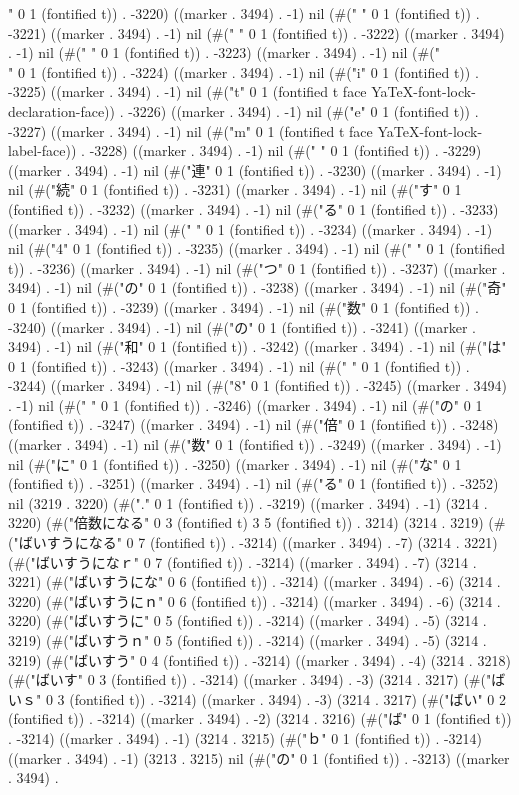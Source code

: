 " 0 1 (fontified t)) . -3220) ((marker . 3494) . -1) nil (#(" " 0 1 (fontified t)) . -3221) ((marker . 3494) . -1) nil (#(" " 0 1 (fontified t)) . -3222) ((marker . 3494) . -1) nil (#(" " 0 1 (fontified t)) . -3223) ((marker . 3494) . -1) nil (#("\\" 0 1 (fontified t)) . -3224) ((marker . 3494) . -1) nil (#("i" 0 1 (fontified t)) . -3225) ((marker . 3494) . -1) nil (#("t" 0 1 (fontified t face YaTeX-font-lock-declaration-face)) . -3226) ((marker . 3494) . -1) nil (#("e" 0 1 (fontified t)) . -3227) ((marker . 3494) . -1) nil (#("m" 0 1 (fontified t face YaTeX-font-lock-label-face)) . -3228) ((marker . 3494) . -1) nil (#(" " 0 1 (fontified t)) . -3229) ((marker . 3494) . -1) nil (#("連" 0 1 (fontified t)) . -3230) ((marker . 3494) . -1) nil (#("続" 0 1 (fontified t)) . -3231) ((marker . 3494) . -1) nil (#("す" 0 1 (fontified t)) . -3232) ((marker . 3494) . -1) nil (#("る" 0 1 (fontified t)) . -3233) ((marker . 3494) . -1) nil (#(" " 0 1 (fontified t)) . -3234) ((marker . 3494) . -1) nil (#("4" 0 1 (fontified t)) . -3235) ((marker . 3494) . -1) nil (#(" " 0 1 (fontified t)) . -3236) ((marker . 3494) . -1) nil (#("つ" 0 1 (fontified t)) . -3237) ((marker . 3494) . -1) nil (#("の" 0 1 (fontified t)) . -3238) ((marker . 3494) . -1) nil (#("奇" 0 1 (fontified t)) . -3239) ((marker . 3494) . -1) nil (#("数" 0 1 (fontified t)) . -3240) ((marker . 3494) . -1) nil (#("の" 0 1 (fontified t)) . -3241) ((marker . 3494) . -1) nil (#("和" 0 1 (fontified t)) . -3242) ((marker . 3494) . -1) nil (#("は" 0 1 (fontified t)) . -3243) ((marker . 3494) . -1) nil (#(" " 0 1 (fontified t)) . -3244) ((marker . 3494) . -1) nil (#("8" 0 1 (fontified t)) . -3245) ((marker . 3494) . -1) nil (#(" " 0 1 (fontified t)) . -3246) ((marker . 3494) . -1) nil (#("の" 0 1 (fontified t)) . -3247) ((marker . 3494) . -1) nil (#("倍" 0 1 (fontified t)) . -3248) ((marker . 3494) . -1) nil (#("数" 0 1 (fontified t)) . -3249) ((marker . 3494) . -1) nil (#("に" 0 1 (fontified t)) . -3250) ((marker . 3494) . -1) nil (#("な" 0 1 (fontified t)) . -3251) ((marker . 3494) . -1) nil (#("る" 0 1 (fontified t)) . -3252) nil (3219 . 3220) (#("." 0 1 (fontified t)) . -3219) ((marker . 3494) . -1) (3214 . 3220) (#("倍数になる" 0 3 (fontified t) 3 5 (fontified t)) . 3214) (3214 . 3219) (#("ばいすうになる" 0 7 (fontified t)) . -3214) ((marker . 3494) . -7) (3214 . 3221) (#("ばいすうになｒ" 0 7 (fontified t)) . -3214) ((marker . 3494) . -7) (3214 . 3221) (#("ばいすうにな" 0 6 (fontified t)) . -3214) ((marker . 3494) . -6) (3214 . 3220) (#("ばいすうにｎ" 0 6 (fontified t)) . -3214) ((marker . 3494) . -6) (3214 . 3220) (#("ばいすうに" 0 5 (fontified t)) . -3214) ((marker . 3494) . -5) (3214 . 3219) (#("ばいすうｎ" 0 5 (fontified t)) . -3214) ((marker . 3494) . -5) (3214 . 3219) (#("ばいすう" 0 4 (fontified t)) . -3214) ((marker . 3494) . -4) (3214 . 3218) (#("ばいす" 0 3 (fontified t)) . -3214) ((marker . 3494) . -3) (3214 . 3217) (#("ばいｓ" 0 3 (fontified t)) . -3214) ((marker . 3494) . -3) (3214 . 3217) (#("ばい" 0 2 (fontified t)) . -3214) ((marker . 3494) . -2) (3214 . 3216) (#("ば" 0 1 (fontified t)) . -3214) ((marker . 3494) . -1) (3214 . 3215) (#("ｂ" 0 1 (fontified t)) . -3214) ((marker . 3494) . -1) (3213 . 3215) nil (#("の" 0 1 (fontified t)) . -3213) ((marker . 3494) . 